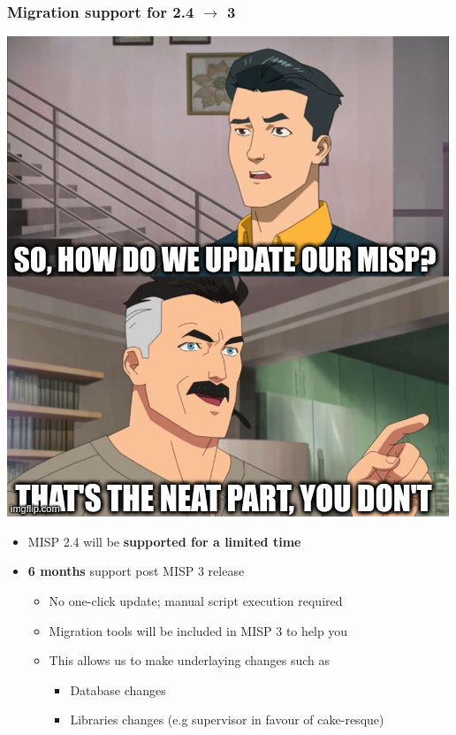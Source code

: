 \begin{frame}
    \frametitle{Migration support for 2.4 $\rightarrow$ 3}
    \begin{center}
        \includegraphics[width=0.35\linewidth]{pictures/update}
    \end{center}
    \begin{itemize}
        \item MISP 2.4 will be \textbf{supported for a limited time}
        \item \textbf{6 months} support post MISP 3 release
        \begin{itemize}
            \item No one-click update; manual script execution required
            \item Migration tools will be included in MISP 3 to help you
            \item This allows us to make underlaying changes such as
            \begin{itemize}
                \item Database changes
                \item Libraries changes (e.g supervisor in favour of cake-resque)
            \end{itemize}
        \end{itemize}
    \end{itemize}
\end{frame}


